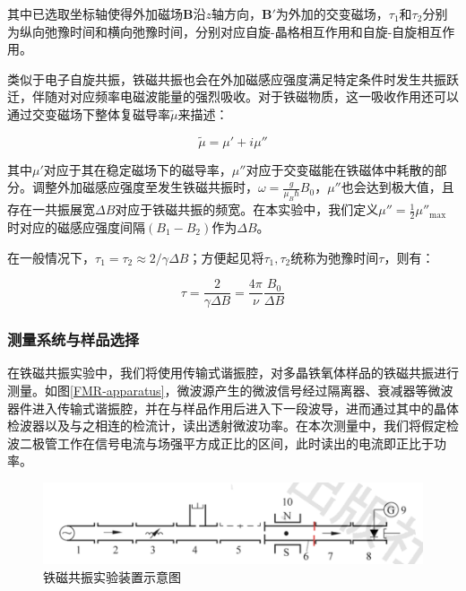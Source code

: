 \documentclass{thuemp}
\begin{document}
    其中已选取坐标轴使得外加磁场$\mathbf{B}$沿$z$轴方向，$\symbf{B'}$为外加的交变磁场，$\tau_1$和$\tau_2$分别为纵向弛豫时间和横向弛豫时间，分别对应自旋-晶格相互作用和自旋-自旋相互作用。
    
    类似于电子自旋共振，铁磁共振也会在外加磁感应强度满足特定条件时发生共振跃迁，伴随对对应频率电磁波能量的强烈吸收。对于铁磁物质，这一吸收作用还可以通过交变磁场下整体复磁导率$\tilde\mu $来描述：
    
    \begin{equation}
        \tilde\mu = \mu' + i\mu''
    \end{equation}
    
    其中$\mu'$对应于其在稳定磁场下的磁导率，$\mu''$对应于交变磁能在铁磁体中耗散的部分。调整外加磁感应强度至发生铁磁共振时，$\omega = \frac{g}{\mu_B\hbar} B_0$，$\mu''$也会达到极大值，且存在一共振展宽$\Delta B$对应于铁磁共振的频宽。在本实验中，我们定义$\mu'' = \frac 1 2 \mu''_{\mathrm{max}}$时对应的磁感应强度间隔$(B_1 - B_2)$作为$\Delta B$。
    
    在一般情况下，$\tau_1 = \tau_2 \approx 2/\gamma \Delta B$；方便起见将$\tau_1, \tau_2$统称为弛豫时间$\tau$，则有：
    
    \begin{equation}
        \tau = \frac{2}{\gamma\Delta B} = \frac{4\pi}{\nu}\frac{B_0}{\Delta B}
    \end{equation}
    
    
    
    \subsubsection{测量系统与样品选择}
    
    在铁磁共振实验中，我们将使用传输式谐振腔，对多晶铁氧体样品的铁磁共振进行测量。如图\ref{FMR-apparatus}，微波源产生的微波信号经过隔离器、衰减器等微波器件进入传输式谐振腔，并在与样品作用后进入下一段波导，进而通过其中的晶体检波器以及与之相连的检流计，读出透射微波功率。在本次测量中，我们将假定检波二极管工作在信号电流与场强平方成正比的区间，此时读出的电流即正比于功率。
    
    \begin{figure}[H]
        \centering
        \includegraphics[width=0.8\linewidth]{./FMR-apparatus.png}
        \caption{铁磁共振实验装置示意图} \label{fig:FMR-apparatus}
    \end{figure}
    
\end{document}
